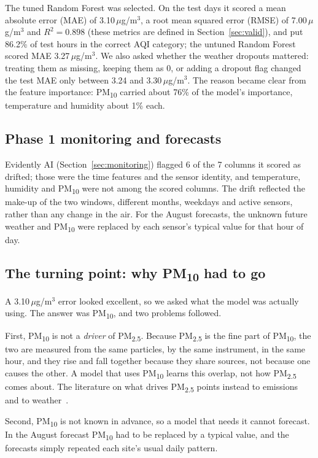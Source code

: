 \documentclass{ieeeaccess}
\newcommand{\ugm}{\,$\mu$g/m$^{3}$}
\newcommand{\pmtwo}{PM\textsubscript{2.5}}
\newcommand{\pmten}{PM\textsubscript{10}}
\begin{document}
The tuned Random Forest was selected. On the test days it scored a mean absolute error (MAE) of 3.10\ugm{}, a root mean squared error (RMSE) of 7.00\ugm{} and $R^2 = 0.898$ (these metrics are defined in Section~\ref{sec:valid}), and put 86.2\% of test hours in the correct AQI category; the untuned Random Forest scored MAE 3.27\ugm{}. We also asked whether the weather dropouts mattered: treating them as missing, keeping them as 0, or adding a dropout flag changed the test MAE only between 3.24 and 3.30\ugm{}. The reason became clear from the feature importance: \pmten{} carried about 76\% of the model's importance, temperature and humidity about 1\% each.

\subsection{Phase 1 monitoring and forecasts}
Evidently AI (Section~\ref{sec:monitoring}) flagged 6 of the 7 columns it scored as drifted; those were the time features and the sensor identity, and temperature, humidity and \pmten{} were not among the scored columns. The drift reflected the make-up of the two windows, different months, weekdays and active sensors, rather than any change in the air. For the August forecasts, the unknown future weather and \pmten{} were replaced by each sensor's typical value for that hour of day.

\subsection{The turning point: why \pmten{} had to go}
\label{sec:turning}
A 3.10\ugm{} error looked excellent, so we asked what the model was actually using. The answer was \pmten{}, and two problems followed.

First, \pmten{} is not a \emph{driver} of \pmtwo{}. Because \pmtwo{} is the fine part of \pmten{}, the two are measured from the same particles, by the same instrument, in the same hour, and they rise and fall together because they share sources, not because one causes the other. A model that uses \pmten{} learns this overlap, not how \pmtwo{} comes about. The literature on what drives \pmtwo{} points instead to emissions and to weather~\cite{wangogawa2015,yang2017,wabinyai2026}.

Second, \pmten{} is not known in advance, so a model that needs it cannot forecast. In the August forecast \pmten{} had to be replaced by a typical value, and the forecasts simply repeated each site's usual daily pattern.
\end{document}
